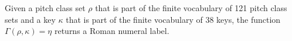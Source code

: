 
Given a pitch class set $\rho$ that is part of the finite
vocabulary of 121 pitch class sets and a key $\kappa$ that
is part of the finite vocabulary of 38 keys, the function
$\Gamma(\rho, \kappa) = \eta$ returns a Roman numeral label.
